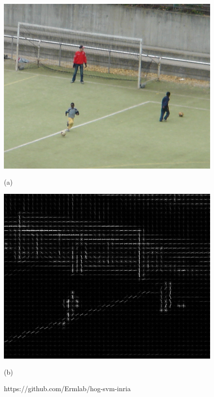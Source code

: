 
\begin{figure}[H]
	\centering
	\begin{minipage}[b]{0.45\textwidth}
		\includegraphics[width=\textwidth]{Bilder/hog1crop.png}
		\caption{(a)}
	\end{minipage}
	\hfill
	\begin{minipage}[b]{0.45\textwidth}
		\includegraphics[width=\textwidth]{Bilder/hog2crop.jpg}
		\caption{(b)}
	\end{minipage}
	\caption{ https://github.com/Ermlab/hog-svm-inria}
	\label{fiq: hog}
\end{figure}